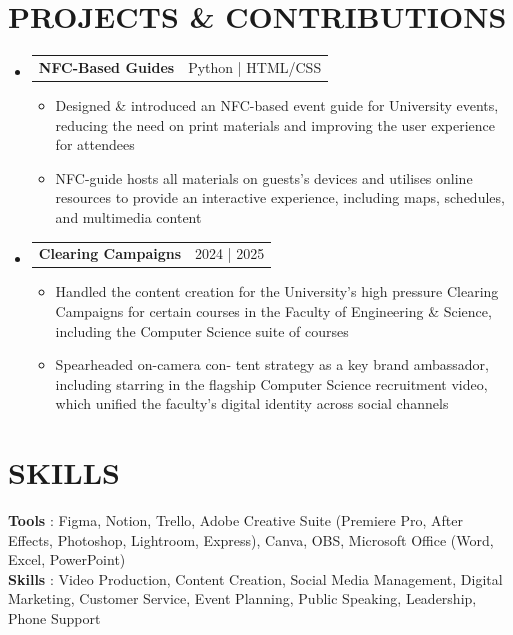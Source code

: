 \documentclass[letterpaper,11pt]{article}
\makeatletter
\newcommand{\resumeItem}[1]{
  \item\footnotesize{
    {#1 \vspace{-1pt}}
  }
}
\newcommand{\resumeProjectHeading}[2]{
    \item
    \begin{tabular*}{\textwidth}{l@{\extracolsep{\fill}}r}
      \textbf{#1} & {\color{dark-grey}\small #2} \\
    \end{tabular*}\vspace{-4pt}
}
\newcommand{\resumeSubHeadingListStart}{\begin{itemize}[leftmargin=0in, label={}]}
\newcommand{\resumeSubHeadingListEnd}{\end{itemize}}
\newcommand{\resumeItemListStart}{\begin{itemize}}
\newcommand{\resumeItemListEnd}{\end{itemize}\vspace{0pt}}
\makeatother
\begin{document}
\section{PROJECTS \& CONTRIBUTIONS}
    \resumeSubHeadingListStart
      \resumeProjectHeading
          {NFC-Based Guides} {Python | HTML/CSS}
          \resumeItemListStart
            \resumeItem{Designed \& introduced an NFC-based event guide for University events, reducing the need on print materials and improving the user experience for attendees}
            \resumeItem{NFC-guide hosts all materials on guests's devices and utilises online resources to provide an interactive experience, including maps, schedules, and multimedia content}
          \resumeItemListEnd
      \resumeProjectHeading
          {Clearing Campaigns} {2024 | 2025}
          \resumeItemListStart
            \resumeItem{Handled the content creation for the University's high pressure Clearing Campaigns for certain courses in the Faculty of Engineering \& Science, including the Computer Science suite of courses}
            \resumeItem{Spearheaded on-camera con-
tent strategy as a key brand ambassador, including starring
in the flagship Computer Science recruitment video, which
unified the faculty’s digital identity across social channels}
          \resumeItemListEnd
          
    \resumeSubHeadingListEnd


\section{SKILLS}
 \begin{itemize}[leftmargin=0in, label={}]
    \small{\item{
     \textbf{Tools}     {: Figma, Notion, Trello, Adobe Creative Suite (Premiere Pro, After Effects, Photoshop, Lightroom, Express), Canva, OBS, Microsoft Office (Word, Excel, PowerPoint)} \\
     \textbf{Skills} {: Video Production, Content Creation, Social Media Management, Digital Marketing, Customer Service, Event Planning, Public Speaking, Leadership, Phone Support} \\
    }}
 \end{itemize}


\end{document}
